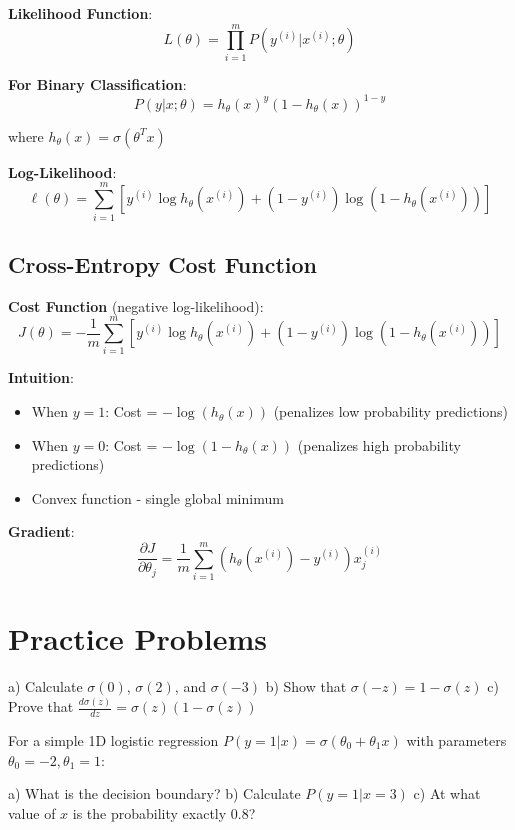 \documentclass{article}
\newcounter{exercise}
\begin{document}
\textbf{Likelihood Function}:
$$L(\theta) = \prod_{i=1}^m P(y^{(i)}|x^{(i)};\theta)$$

\textbf{For Binary Classification}:
$$P(y|x;\theta) = h_\theta(x)^y (1-h_\theta(x))^{1-y}$$

where $h_\theta(x) = \sigma(\theta^T x)$

\textbf{Log-Likelihood}:
$$\ell(\theta) = \sum_{i=1}^m [y^{(i)} \log h_\theta(x^{(i)}) + (1-y^{(i)}) \log(1-h_\theta(x^{(i)}))]$$

\subsection{Cross-Entropy Cost Function}

\textbf{Cost Function} (negative log-likelihood):
$$J(\theta) = -\frac{1}{m} \sum_{i=1}^m [y^{(i)} \log h_\theta(x^{(i)}) + (1-y^{(i)}) \log(1-h_\theta(x^{(i)}))]$$

\textbf{Intuition}:
\begin{itemize}
    \item When $y=1$: Cost = $-\log(h_\theta(x))$ (penalizes low probability predictions)
    \item When $y=0$: Cost = $-\log(1-h_\theta(x))$ (penalizes high probability predictions)
    \item Convex function - single global minimum
\end{itemize}

\textbf{Gradient}:
$$\frac{\partial J}{\partial \theta_j} = \frac{1}{m} \sum_{i=1}^m (h_\theta(x^{(i)}) - y^{(i)}) x_j^{(i)}$$

\section{Practice Problems}

\begin{tcolorbox}[colback=gray!5!white,colframe=gray!75!black,title=Problem \stepcounter{exercise}: Sigmoid Function Properties]

a) Calculate $\sigma(0)$, $\sigma(2)$, and $\sigma(-3)$
b) Show that $\sigma(-z) = 1 - \sigma(z)$
c) Prove that $\frac{d\sigma(z)}{dz} = \sigma(z)(1-\sigma(z))$
\end{tcolorbox}

\begin{tcolorbox}[colback=gray!5!white,colframe=gray!75!black,title=Problem \stepcounter{exercise}: Binary Classification Setup]

For a simple 1D logistic regression $P(y=1|x) = \sigma(\theta_0 + \theta_1 x)$ with parameters $\theta_0 = -2, \theta_1 = 1$:

a) What is the decision boundary?
b) Calculate $P(y=1|x=3)$
c) At what value of $x$ is the probability exactly 0.8?
\end{tcolorbox}
\end{document}
